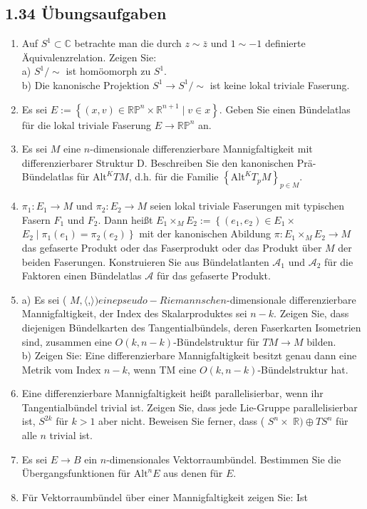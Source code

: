 \documentclass[10pt, letterpaper]{article}
\begin{document}
\subsection*{1.34 Übungsaufgaben}
\begin{enumerate}
  \item Auf $S^{1} \subset \mathbb{C}$ betrachte man die durch $z \sim \bar{z}$ und $1 \sim-1$ definierte Äquivalenzrelation. Zeigen Sie:\\
a) $S^{1} / \sim$ ist homöomorph zu $S^{1}$.\\
b) Die kanonische Projektion $S^{1} \rightarrow S^{1} / \sim$ ist keine lokal triviale Faserung.
  \item Es sei $E:=\left\{(x, v) \in \mathbb{R P}^{n} \times \mathbb{R}^{n+1} \mid v \in x\right\}$. Geben Sie einen Bündelatlas für die lokal triviale Faserung $E \rightarrow \mathbb{R} \mathbb{P}^{n}$ an.
  \item Es sei $M$ eine $n$-dimensionale differenzierbare Mannigfaltigkeit mit differenzierbarer Struktur D. Beschreiben Sie den kanonischen Prä-Bündelatlas für $\mathrm{Alt}^{K} T M$, d.h. für die Familie $\left\{\mathrm{Alt}^{K} T_{p} M\right\}_{p \in M}$.
  \item $\pi_{1}: E_{1} \rightarrow M$ und $\pi_{2}: E_{2} \rightarrow M$ seien lokal triviale Faserungen mit typischen Fasern $F_{1}$ und $F_{2}$. Dann heißt $E_{1} \times_{M} E_{2}:=\left\{\left(e_{1}, e_{2}\right) \in E_{1} \times\right.$ $\left.E_{2} \mid \pi_{1}\left(e_{1}\right)=\pi_{2}\left(e_{2}\right)\right\}$ mit der kanonischen Abildung $\pi: E_{1} \times_{M} E_{2} \rightarrow M$ das gefaserte Produkt oder das Faserprodukt oder das Produkt über $M$ der beiden Faserungen. Konstruieren Sie aus Bündelatlanten $\mathcal{A}_{1}$ und $\mathcal{A}_{2}$ für die Faktoren einen Bündelatlas $\mathcal{A}$ für das gefaserte Produkt.
  \item a) Es sei ( $M,\langle$,$\rangle ) eine pseudo-Riemannsche n$-dimensionale differenzierbare Mannigfaltigkeit, der Index des Skalarproduktes sei $n-k$. Zeigen Sie, dass diejenigen Bündelkarten des Tangentialbündels, deren Faserkarten Isometrien sind, zusammen eine $O(k, n-k)$-Bündelstruktur für $T M \rightarrow M$ bilden.\\
b) Zeigen Sie: Eine differenzierbare Mannigfaltigkeit besitzt genau dann eine Metrik vom Index $n-k$, wenn TM eine $O(k, n-k)$-Bündelstruktur hat.
  \item Eine differenzierbare Mannigfaltigkeit heißt parallelisierbar, wenn ihr Tangentialbündel trivial ist. Zeigen Sie, dass jede Lie-Gruppe parallelisierbar ist, $S^{2 k}$ für $k>1$ aber nicht. Beweisen Sie ferner, dass ( $S^{n} \times$ $\mathbb{R}) \oplus T S^{n}$ für alle $n$ trivial ist.
  \item Es sei $E \rightarrow B$ ein $n$-dimensionales Vektorraumbündel. Bestimmen Sie die Übergangsfunktionen für $\mathrm{Alt}^{n} E$ aus denen für $E$.
  \item Für Vektorraumbündel über einer Mannigfaltigkeit zeigen Sie: Ist
\end{enumerate}
\end{document}

